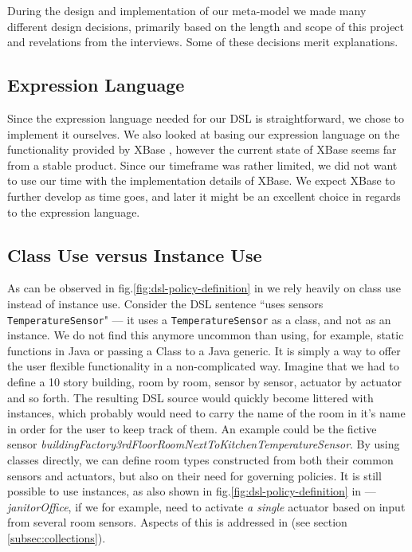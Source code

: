 During the design and implementation of our meta-model we made many different design decisions, primarily based on the length and scope of this project and revelations from the interviews. Some of these decisions merit explanations.

\subsection{Expression Language}
Since the expression language needed for our DSL is straightforward, we chose to implement it ourselves. We also looked at basing our expression language on the functionality provided by XBase \cite{xbase}, however the current state of XBase seems far from a stable product. Since our timeframe was rather limited, we did not want to use our time with the implementation details of XBase. We expect XBase to further develop as time goes, and later it might be an excellent choice in regards to the expression language.

\subsection{Class Use versus Instance Use}
As can be observed in fig.\ref{fig:dsl-policy-definition} in  we rely heavily on class use instead of instance use. Consider the DSL sentence ``uses sensors \texttt{TemperatureSensor}" --- it uses a \texttt{TemperatureSensor} as a class, and not as an instance. We do not find this anymore uncommon than using, for example, static functions in Java or passing a Class to a Java generic. It is simply a way to offer the user flexible functionality in a non-complicated way. Imagine that we had to define a 10 story building, room by room, sensor by sensor, actuator by actuator and so forth. The resulting DSL source would quickly become littered with instances, which probably would need to carry the name of the room in it's name in order for the user to keep track of them. An example could be the fictive sensor \textit{buildingFactory3rdFloorRoomNextToKitchenTemperatureSensor}. By using classes directly, we can define room types constructed from both their common sensors and actuators, but also on their need for governing policies. It is still possible to use instances, as also shown in fig.\ref{fig:dsl-policy-definition} in  --- \textit{janitorOffice}, if we for example, need to activate \textit{a single} actuator based on input from several room sensors. Aspects of this is addressed in  (see section \ref{subsec:collections}).
